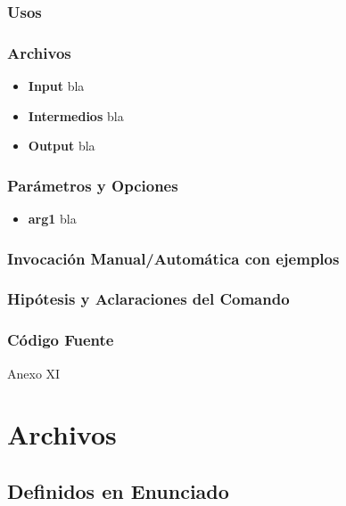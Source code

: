 \documentclass[a4paper,10pt,titlepage]{article}
\begin{document}
		\subsubsection{Usos}


		\subsubsection{Archivos}
			\begin {itemize}
				\item \textbf{Input} {bla}
				\item \textbf{Intermedios} {bla}
				\item \textbf{Output} {bla}
			\end{itemize}

		\subsubsection{Par\'ametros y Opciones}
			\begin {itemize}
				\item \textbf{arg1} {bla}
			\end{itemize}
	
		\subsubsection{Invocaci\'on Manual/Autom\'atica con ejemplos}

		\subsubsection{Hip\'otesis y Aclaraciones del Comando}

		\subsubsection{C\'odigo Fuente}
			Anexo XI

\section{Archivos}

	\subsection{Definidos en Enunciado}
		
\end{document}
